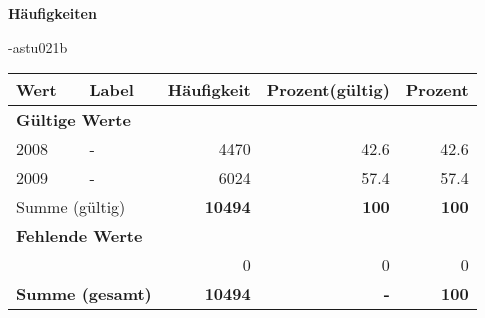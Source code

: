         		\vspace*{0.5cm}
                \noindent\textbf{Häufigkeiten}

                \vspace*{-\baselineskip}
					\begin{filecontents}{\jobname-astu021b}
					\begin{longtable}{lXrrr}
					\toprule
					\textbf{Wert} & \textbf{Label} & \textbf{Häufigkeit} & \textbf{Prozent(gültig)} & \textbf{Prozent} \\
					\endhead
					\midrule
					\multicolumn{5}{l}{\textbf{Gültige Werte}}\\

					2008 &
					\multicolumn{1}{X}{ -  } &


					  \num{4470} &
					  \num[round-mode=places,round-precision=2]{42,6} &
					    \num[round-mode=places,round-precision=2]{42,6} \\

					2009 &
					\multicolumn{1}{X}{ -  } &


					  \num{6024} &
					  \num[round-mode=places,round-precision=2]{57,4} &
					    \num[round-mode=places,round-precision=2]{57,4} \\
					\midrule
					\multicolumn{2}{l}{Summe (gültig)} &
					  \textbf{\num{10494}} &
					\textbf{100} &
					  \textbf{\num[round-mode=places,round-precision=2]{100}} \\
					\multicolumn{5}{l}{\textbf{Fehlende Werte}}\\
						& & 0 & 0 & 0 \\
					\midrule
					\multicolumn{2}{l}{\textbf{Summe (gesamt)}} &
				      \textbf{\num{10494}} &
				    \textbf{-} &
				    \textbf{100} \\
					\bottomrule
					\end{longtable}
					\end{filecontents}
				\label{tableValues:astu021b}
				\vspace*{-\baselineskip}
